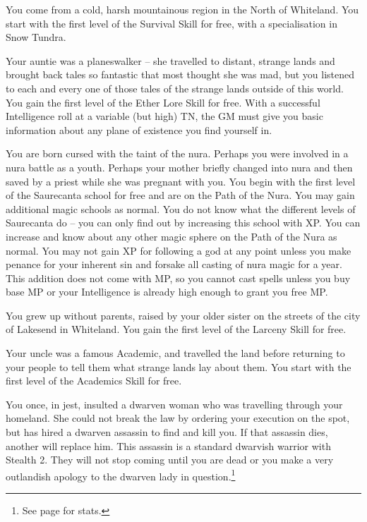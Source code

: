 \begin{multicols}{2}
\begin{list}{\addtocounter{list}{1}\textbf{:}}{\raggedleft}
\item{You come from a cold, harsh mountainous region in the North of Whiteland.  You start with the first level of the Survival Skill for free, with a specialisation in Snow Tundra.}

\item{Your auntie was a planeswalker -- she travelled to distant, strange lands and brought back tales so fantastic that most thought she was mad, but you listened to each and every one of those tales of the strange lands outside of this world.  You gain the first level of the Ether Lore Skill for free.  With a successful Intelligence roll at a variable (but high) TN, the GM must give you basic information about any plane of existence you find yourself in.}

\item{You are born cursed with the taint of the nura.  Perhaps you were involved in a nura battle as a youth.  Perhaps your mother briefly changed into nura and then saved by a priest while she was pregnant with you.  You begin with the first level of the Saurecanta school for free and are on the Path of the Nura.  You may gain additional magic schools as normal.  You do not know what the different levels of Saurecanta do -- you can only find out by increasing this school with XP.  You can increase and know about any other magic sphere on the Path of the Nura as normal.  You may not gain XP for following a god at any point unless you make penance for your inherent sin and forsake all casting of nura magic for a year.  This addition does not come with MP, so you cannot cast spells unless you buy base MP or your Intelligence is already high enough to grant you free MP.}

\item{You grew up without parents, raised by your older sister on the streets of the city of Lakesend in Whiteland.  You gain the first level of the Larceny Skill for free.}

\item{Your uncle was a famous Academic, and travelled the land before returning to your people to tell them what strange lands lay about them.  You start with the first level of the Academics Skill for free.}

\item{You once, in jest, insulted a dwarven woman who was travelling through your homeland.  She could not break the law by ordering your execution on the spot, but has hired a dwarven assassin to find and kill you.  If that assassin dies, another will replace him.  This assassin is a standard dwarvish warrior with Stealth 2.  They will not stop coming until you are dead or you make a very outlandish apology to the dwarven lady in question.\footnote{See page \pageref{dwarven_soldier} for stats.}}


\end{list}
\end{multicols}
